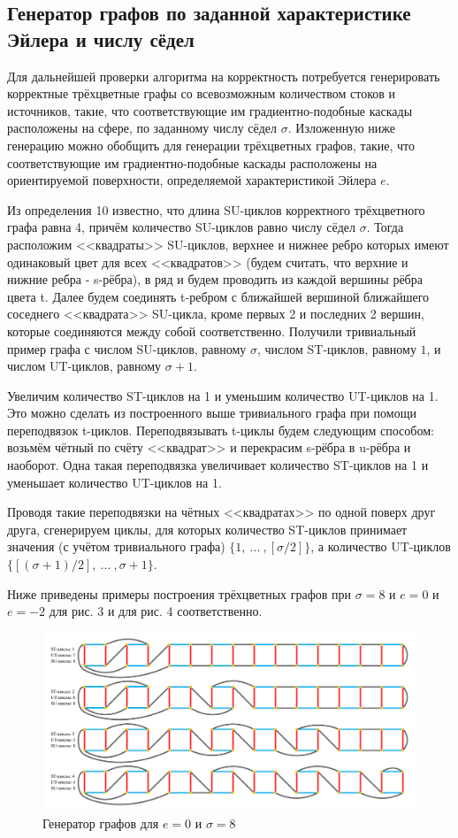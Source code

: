 	\subsection{Генератор графов по заданной характеристике Эйлера и числу сёдел}
	\hspace{0.5 cm} Для дальнейшей проверки алгоритма на корректность потребуется генерировать корректные трёхцветные графы со всевозможным количеством стоков и источников, такие, что соответствующие им градиентно-подобные каскады расположены на сфере, по заданному числу сёдел $\sigma$. Изложенную ниже генерацию можно обобщить для генерации трёхцветных графов, такие, что соответствующие им градиентно-подобные каскады расположены на ориентируемой поверхности, определяемой характеристикой Эйлера $e$.
	\par Из определения 10 известно, что длина SU-циклов корректного трёхцветного графа равна 4, причём количество SU-циклов равно числу сёдел $\sigma$. Тогда расположим <<квадраты>> SU-циклов, верхнее и нижнее ребро которых имеют одинаковый цвет для всех <<квадратов>> (будем считать, что верхние и нижние ребра - s-рёбра), в ряд и будем проводить из каждой вершины рёбра цвета t. Далее будем соединять t-ребром с ближайшей вершиной ближайшего соседнего <<квадрата>> SU-цикла, кроме первых 2 и последних 2 вершин, которые соединяются между собой соответственно. Получили тривиальный пример графа с числом SU-циклов, равному $\sigma$, числом ST-циклов, равному $1$, и числом UT-циклов, равному $\sigma+1$.
	\par Увеличим количество ST-циклов на 1 и уменьшим количество UT-циклов на 1. Это можно сделать из построенного выше тривиального графа при помощи переподвязок t-циклов. Переподвязывать t-циклы будем следующим способом: возьмём чётный по счёту <<квадрат>> и перекрасим s-рёбра в u-рёбра и наоборот. Одна такая переподвязка увеличивает количество ST-циклов на 1 и уменьшает количество UT-циклов на 1.
	\par Проводя такие переподвязки на чётных <<квадратах>> по одной поверх друг друга, сгенерируем циклы, для которых количество ST-циклов принимает значения (с учётом тривиального графа) $\{1,~...~, [\sigma/2]\}$, а количество UT-циклов $\{[(\sigma + 1)/2],~...~, \sigma+1\}$.
	\par Ниже приведены примеры построения трёхцветных графов при $\sigma=8$ и $e=0$ и $e=-2$ для рис. 3 и для рис. 4 соответственно.
	\begin{figure}[h!]
	\centering
	\includegraphics[width=\textwidth]{Torus.png}
	\caption{Генератор графов для $e=0$ и $\sigma=8$ \label{overflow}}
	\end{figure}
